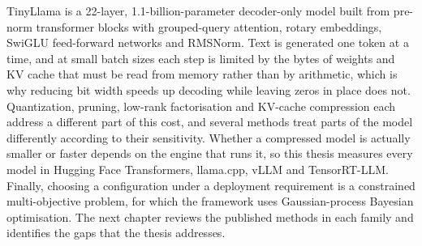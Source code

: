 TinyLlama is a 22-layer, 1.1-billion-parameter decoder-only model built from pre-norm transformer blocks with grouped-query attention, rotary embeddings, SwiGLU feed-forward networks and RMSNorm. Text is generated one token at a time, and at small batch sizes each step is limited by the bytes of weights and KV cache that must be read from memory rather than by arithmetic, which is why reducing bit width speeds up decoding while leaving zeros in place does not. Quantization, pruning, low-rank factorisation and KV-cache compression each address a different part of this cost, and several methods treat parts of the model differently according to their sensitivity. Whether a compressed model is actually smaller or faster depends on the engine that runs it, so this thesis measures every model in Hugging Face Transformers, llama.cpp, vLLM and TensorRT-LLM. Finally, choosing a configuration under a deployment requirement is a constrained multi-objective problem, for which the framework uses Gaussian-process Bayesian optimisation. The next chapter reviews the published methods in each family and identifies the gaps that the thesis addresses.
